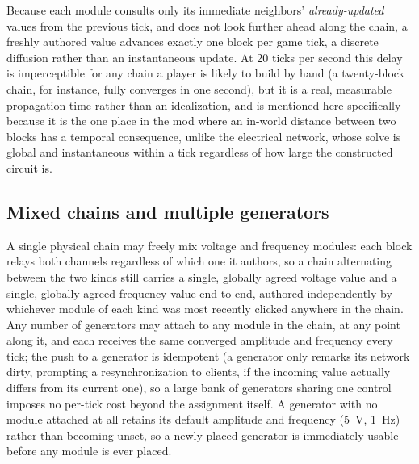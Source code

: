 Because each module consults only its immediate neighbors' \emph{already-updated} values
from the previous tick, and does not look further ahead along the chain, a freshly
authored value advances exactly one block per game tick, a discrete diffusion rather than
an instantaneous update. At 20 ticks per second this delay is imperceptible for any chain a
player is likely to build by hand (a twenty-block chain, for instance, fully converges in
one second), but it is a real, measurable propagation time rather than an idealization, and
is mentioned here specifically because it is the one place in the mod where an in-world
distance between two blocks has a temporal consequence, unlike the electrical network, whose
solve is global and instantaneous within a tick regardless of how large the constructed
circuit is.

\subsection{Mixed chains and multiple generators}

A single physical chain may freely mix voltage and frequency modules: each block relays both
channels regardless of which one it authors, so a chain alternating between the two kinds
still carries a single, globally agreed voltage value and a single, globally agreed
frequency value end to end, authored independently by whichever module of each kind was most
recently clicked anywhere in the chain. Any number of generators may attach to any module in
the chain, at any point along it, and each receives the same converged amplitude and
frequency every tick; the push to a generator is idempotent (a generator only remarks its
network dirty, prompting a resynchronization to clients, if the incoming value actually
differs from its current one), so a large bank of generators sharing one control imposes no
per-tick cost beyond the assignment itself. A generator with no module attached at all
retains its default amplitude and frequency (5~V, 1~Hz) rather than becoming unset, so a
newly placed generator is immediately usable before any module is ever placed.
